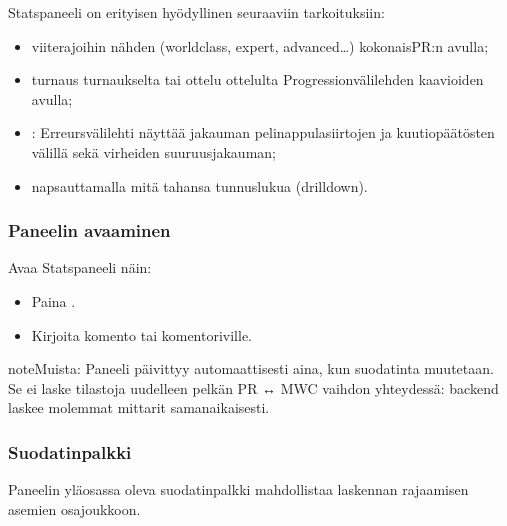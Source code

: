\documentclass[letterpaper,10pt,finnish]{sphinxmanual}
\begin{document}
\sphinxAtStartPar
Stats\sphinxhyphen{}paneeli on erityisen hyödyllinen seuraaviin tarkoituksiin:
\begin{itemize}
\item {} 
\sphinxAtStartPar
{} viiterajoihin nähden (world\sphinxhyphen{}class, expert, advanced…) kokonais\sphinxhyphen{}PR:n avulla;

\item {} 
\sphinxAtStartPar
{} turnaus turnaukselta tai ottelu ottelulta Progression\sphinxhyphen{}välilehden kaavioiden avulla;

\item {} 
\sphinxAtStartPar
{}: Erreurs\sphinxhyphen{}välilehti näyttää jakauman pelinappulasiirtojen ja kuutiopäätösten välillä sekä virheiden suuruusjakauman;

\item {} 
\sphinxAtStartPar
{} napsauttamalla mitä tahansa tunnuslukua (drill\sphinxhyphen{}down).

\end{itemize}


\subsubsection{Paneelin avaaminen}
\label{\detokenize{manuel:ouverture-du-panneau}}
\sphinxAtStartPar
Avaa Stats\sphinxhyphen{}paneeli näin:
\begin{itemize}
\item {} 
\sphinxAtStartPar
Paina .

\item {} 
\sphinxAtStartPar
Kirjoita komento  tai  komentoriville.

\end{itemize}

\begin{sphinxadmonition}{note}{Muista:}
\sphinxAtStartPar
Paneeli päivittyy automaattisesti aina, kun suodatinta muutetaan. Se ei laske tilastoja uudelleen pelkän PR ↔ MWC \sphinxhyphen{}vaihdon yhteydessä: backend laskee molemmat mittarit samanaikaisesti.
\end{sphinxadmonition}


\subsubsection{Suodatinpalkki}
\label{\detokenize{manuel:barre-de-filtre}}
\sphinxAtStartPar
Paneelin yläosassa oleva suodatinpalkki mahdollistaa laskennan rajaamisen asemien osajoukkoon.
\end{document}
